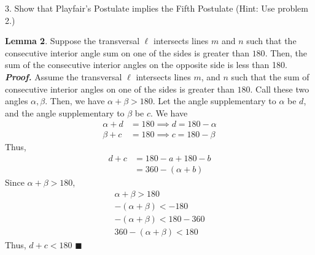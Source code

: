 \documentclass{report}
\begin{document}
    \pagebreak \bigbreak \noindent 
    \begin{mdframed}
        3. Show that Playfair's Postulate implies the Fifth Postulate (Hint: Use problem 2.)
    \end{mdframed}
    \bigbreak \noindent 
    \textbf{Lemma 2}. Suppose the transversal $\ell$ intersects lines $m$ and $n$ such that the consecutive interior angle sum on one of the sides is greater than $180$. Then, the sum of the consecutive interior angles on the opposite side is less than 180.
    \bigbreak \noindent 
    \textbf{\textit{Proof.}} Assume the transversal $\ell$ intersects lines $m$, and $n$ such that the sum of consecutive interior angles on one of the sides is greater than $180$. Call these two angles $\alpha,\beta$. Then, we have $\alpha + \beta > 180$. Let the angle supplementary to $\alpha$ be $d$, and the angle supplementary to $\beta$ be $c$. We have
    \begin{align*}
        \alpha + d &= 180 \implies d = 180 - \alpha\\
        \beta + c &= 180 \implies c = 180 - \beta
    \end{align*}
    Thus,
    \begin{align*}
        d + c &= 180 -a  +180 - b \\
        &= 360 - (\alpha + b)
    \end{align*}
    Since $\alpha + \beta > 180$, 
    \begin{align*}
        \alpha + \beta > 180 \\
        -(\alpha + \beta) < -180 \\
        -(\alpha + \beta) < 180 - 360 \\
        360 - (\alpha + \beta) < 180
    \end{align*}
    Thus, $d+c < 180$ \hspace*{\fill} $\blacksquare$
\end{document}
